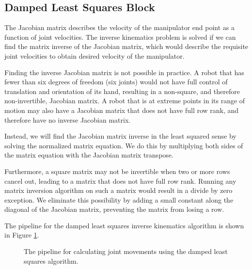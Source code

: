 \subsection{Damped Least Squares Block}

The Jacobian matrix describes the velocity of the manipulator end point as a function of joint velocities. The inverse kinematics problem is solved if we can find the matrix inverse of the Jacobian matrix, which would describe the requisite joint velocities to obtain desired velocity of the manipulator.

Finding the inverse Jacobian matrix is not possible in practice. A robot that has fewer than six degrees of freedom (six joints) would not have full control of translation and orientation of its hand, resulting in a non-square, and therefore non-invertible, Jacobian matrix. A robot that is at extreme points in its range of motion may also have a Jacobian matrix that does not have full row rank, and therefore have no inverse Jacobian matrix.

Instead, we will find the Jacobian matrix inverse in the least squared sense by solving the normalized matrix equation. We do this by multiplying both sides of the matrix equation with the Jacobian matrix transpose.

Furthermore, a square matrix may not be invertible when two or more rows cancel out, leading to a matrix that does not have full row rank. Running any matrix inversion algorithm on such a matrix would result in a divide by zero exception. We eliminate this possibility by adding a small constant along the diagonal of the Jacobian matrix, preventing the matrix from losing a row.

The pipeline for the damped least squares inverse kinematics algorithm is shown in Figure \ref{fig:damped_least_squares}.

\begin{figure}[ht]
\center
{}
\caption{The pipeline for calculating joint movements using the damped least squares algorithm.}
\label{fig:damped_least_squares}
\end{figure}